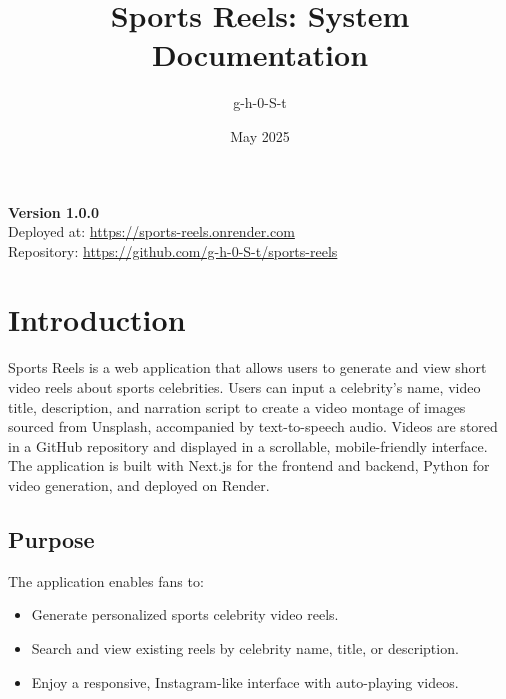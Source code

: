 \documentclass[a4paper,12pt]{article}
\title{Sports Reels: System Documentation}
\author{g-h-0-S-t}
\date{May 2025}
\begin{document}
\maketitle
\begin{center}
    \vspace{1cm}
    \textbf{Version 1.0.0} \\
    \vspace{0.5cm}
    Deployed at: \url{https://sports-reels.onrender.com} \\
    Repository: \url{https://github.com/g-h-0-S-t/sports-reels}
\end{center}
\thispagestyle{empty}
\newpage

\tableofcontents
\newpage

\section{Introduction}
Sports Reels is a web application that allows users to generate and view short video reels about sports celebrities. Users can input a celebrity's name, video title, description, and narration script to create a video montage of images sourced from Unsplash, accompanied by text-to-speech audio. Videos are stored in a GitHub repository and displayed in a scrollable, mobile-friendly interface. The application is built with Next.js for the frontend and backend, Python for video generation, and deployed on Render.

\subsection{Purpose}
The application enables fans to:
\begin{itemize}
    \item Generate personalized sports celebrity video reels.
    \item Search and view existing reels by celebrity name, title, or description.
    \item Enjoy a responsive, Instagram-like interface with auto-playing videos.
\end{itemize}
\end{document}
